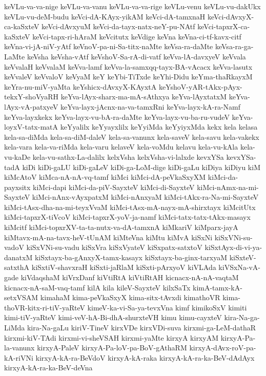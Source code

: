 {keVLu-va-va-nige
keVLu-va-vanu
keVLu-va-va-rige
keVLu-venu
keVLu-vu-dakUkx
keVLu-vu-deM-budu
keVci-dA-KAyx-yikAM
keVci-dA-tamxnaH
keVci-dAvxyX-ca-kaSxteV
keVci-dAvxyuM
keVci-da-tayx-natx-neY-pu-NAtf
keVci-tapxrX-ca-kaSxteV
keVci-tapx-ri-hAraM
keVcitutx
keVdige
keVna
keVna-ci-tf-kavx-citf
keVna-vi-jA-niV-yAtf
keVnoV-pa-ni-Sa-titx-naMte
keVsa-ra-daMte
keVsa-ra-ga-LaMte
keVsha
keVsha-vAtf
keVshoV-Sa-rA-di-vatf
keVva-lA-davxyeV
keVvala
keVvalaH
keVvalaM
keVva-lamf
keVva-la-samxqq-tayx-BA-vAcacx
keVva-lasutx
keVvaleV
keVvaloV
keVyaM
keY
keYbi-TiTxde
keYhi-Didu
keYma-thaRkayxM
keYra-nu-miV-yaMta
keYshicx-dAvxyX-KAyxtA
keYshoV-yAR-tAkx-pAyx-tekxY-shoVyaRH
keYva-lAyx-sharx-ma-mA-sAthxya
keYva-lAyxtatxM
keYva-lAyx-vA-patxyeV
keYva-layx-jAcnx-na-va-tamxRni
keYva-layx-kA-ra-Namf
keYva-layxkekx
keYva-layx-vu-bA-ra-daMte
keYva-layx-vu-ba-ru-vudeV
keYva-loyxV-tatx-matA
keYyalilx
keYyayxlilx
keYyiMda
keYyiyxMda
kekx
kela
kelasa
kela-sa-diMda
kela-sa-diM-daleV
kela-sa-vanunx
kela-saveV
kela-savu
kela-vakekx
kela-vara
kela-va-riMda
kela-varu
kelaveV
kela-voMdu
kelavu
kela-vu-kAla
kela-vu-kaDe
kela-vu-sathx-La-dalilx
kelxVsha
kelxVsha-vi-lalxde
kevxYSa
kevxYSa-tadA
kiDi
kiDi-gaLU
kiDi-gaLeV
kiDi-ga-LoM-dige
kiDi-gaLu
kiDiya
kiDiyu
kiM
kiMcAtoV
kiMca-nA-nA-vq-tamf
kiMci
kiMci-dA-peVkaSxyXM
kiMci-da-payxsitx
kiMci-dapi
kiMci-da-piV-SayxteV
kiMci-di-SayxteV
kiMci-nAmx-na-mi-SayxteV
kiMci-nAnx-vAyxpatxM
kiMci-nAnxyaM
kiMci-tAkx-ra-Na-mi-SayxteV
kiMci-tAsx-dha-na-mi-teyxVvaM
kiMci-tAsx-mA-nayx-mA-shirxtayx
kiMcitUtx
kiMci-tapxrX-tiVcoV
kiMci-tapxrX-yoV-ja-namf
kiMci-tatx-tatx-tAkx-masayx
kiMcitf
kiMci-topxrXV-ta-ta-nutx-va-dA-tamxnA
kiMkariV
kiMparx-jayA
kiMtavx-mA-na-tavx-heV-tUnAM
kiMteVna
kiMtu
kiMvA
kiSxNi
kiSxVNi-su-vadoV
kiSxVNi-su-vadu
kiSxVra
kiSxVyateV
kiSxpatx-satxtoV
kiSxtAyx-di-vi-ya-danatxM
kiSxtayx-ba-gAnxyX-tamx-kasayx
kiSxtayx-ba-ginx-tarxyaM
kiSxteV-satxthA
kiSxtiV-shavxraH
kiSxti-jaRlaM
kiSxti-pArxyoV
kiVLAda
kiVSxNa-vA-gade
kiVdaqshaM
kiVrxDanf
kiVtiRtA
kiVtiRtAH
kicnacx-nA-nA-vaqtaM
kicnacx-nA-saM-vaq-tamf
kilA
kila
kileV-SayxteV
kilxSaTx
kimA-tamx-kA-setxVSAM
kimahaM
kima-peVkaSxyX
kima-sitx-tAvxdi
kimathoVR
kima-thoVR-kitx-ri-tiV-yaRteV
kimeV-ka-vi-Sa-ya-tevxVna
kimf
kimikoSxV
kimiti
kimi-tiV-yaRteV
kimi-veV-hA-Bi-dhA-shurxteVH
kimu
kimu-cayxteV
kira-Na-ga-LiMda
kira-Na-gaLu
kiriV-TineV
kirxVDe
kirxVDi-suva
kirxmi-ga-LeM-dathaR
kirxmi-kiV-TAdi
kirxmi-vi-sheVSAH
kirxmi-yaMte
kirxyA
kirxyAM
kirxyA-Pa-la-vanunx
kirxyA-PaleV
kirxyA-Pa-loV-pa-BoV-gAthaRM
kirxyA-dAvx-roV-pa-kA-riVNi
kirxyA-kA-ra-BeVdoV
kirxyA-kA-raka
kirxyA-kA-ra-ka-BeV-dAdAyx
kirxyA-kA-ra-ka-BeV-deVna
}
